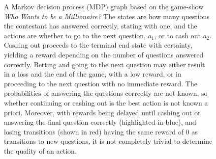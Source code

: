 \begin{figure}
    \vspace{1cm}

    \caption[
        Example Markov decision process graph.
    ]
    {
        A Markov decision process (MDP) graph based on the game-show \textit{Who Wants to be a Millionaire?}
        The states are how many questions the contestant has answered correctly, stating with one, and the actions are whether to go to the next question, $a_1$, or to cash out $a_2$.
        Cashing out proceeds to the terminal end state with certainty, yielding a reward depending on the number of questions answered correctly.
        Betting and going to the next question may either result in a loss and the end of the game, with a low reward, or in proceeding to the next question with no immediate reward.
        The probabilities of answering the questions correctly are not known, so whether continuing or cashing out is the best action is not known a priori.
        Moreover, with rewards being delayed until cashing out or answering the final question correctly (highlighted in blue), and losing transitions (shown in red) having the same reward of 0 as transitions to new questions, it is not completely trivial to determine the quality of an action.
    }
    \label{fig:mdp}
\end{figure}


